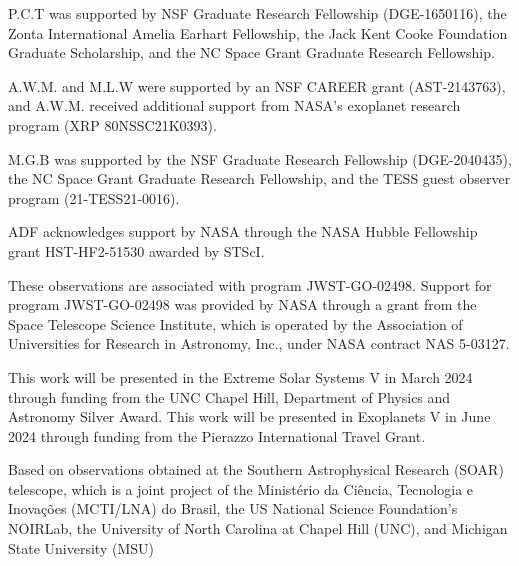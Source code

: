 \documentclass[twocolumn]{aastex63} %
\begin{document}

\acknowledgements


P.C.T was supported by NSF Graduate Research Fellowship (DGE-1650116), the Zonta International Amelia Earhart Fellowship, the Jack Kent Cooke Foundation Graduate Scholarship, and the NC Space Grant Graduate Research Fellowship. 

A.W.M. and M.L.W were supported by an NSF CAREER grant (AST-2143763), and A.W.M. received additional support from NASA's exoplanet research program (XRP 80NSSC21K0393). 

M.G.B was supported by the NSF Graduate Research Fellowship (DGE-2040435), the NC Space Grant Graduate Research Fellowship, and the TESS guest observer program (21-TESS21-0016). 

ADF acknowledges support by NASA through the NASA Hubble Fellowship grant HST-HF2-51530 awarded by STScI.

These observations are associated with program JWST-GO-02498. Support for program JWST-GO-02498 was provided by NASA through a grant from the Space Telescope Science Institute, which is operated by the Association of Universities for Research in Astronomy, Inc., under NASA contract NAS 5-03127. 


This work will be presented in the Extreme Solar Systems V in March 2024 through funding from the UNC Chapel Hill, Department of Physics and Astronomy Silver Award. This work will be presented in Exoplanets V in June 2024 through funding from the Pierazzo International Travel Grant. 


Based on observations obtained at the Southern Astrophysical Research (SOAR) telescope, which is a joint project of the Minist\'{e}rio da Ci\^{e}ncia, Tecnologia e Inova\c{c}\~{o}es (MCTI/LNA) do Brasil, the US National Science Foundation’s NOIRLab, the University of North Carolina at Chapel Hill (UNC), and Michigan State University (MSU)
\end{document}
